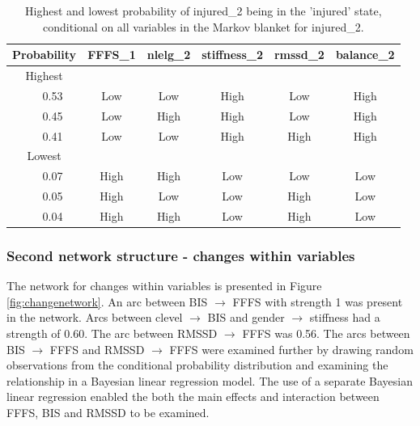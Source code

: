 \documentclass[man,floatsintext]{apa6}
\begin{document}
\begin{table}[H]

\begin{center}
\begin{threeparttable}

\caption{\label{tab:query4}Highest and lowest probability of injured\_2 being in the 'injured' state, conditional on all variables in the Markov blanket for injured\_2.}

\begin{tabular}{cccccc}
\toprule
Probability & \multicolumn{1}{c}{FFFS\_1} & \multicolumn{1}{c}{nlelg\_2} & \multicolumn{1}{c}{stiffness\_2} & \multicolumn{1}{c}{rmssd\_2} & \multicolumn{1}{c}{balance\_2}\\
\midrule
Highest &  &  &  &  & \\
\ \ \ 0.53 & Low & Low & High & Low & High\\
\ \ \ 0.45 & Low & High & High & Low & High\\
\ \ \ 0.41 & Low & Low & High & High & High\\
Lowest &  &  &  &  & \\
\ \ \ 0.07 & High & High & Low & Low & Low\\
\ \ \ 0.05 & High & Low & Low & High & Low\\
\ \ \ 0.04 & High & High & Low & High & Low\\
\bottomrule
\end{tabular}

\end{threeparttable}
\end{center}

\end{table}

\hypertarget{second-network-structure---changes-within-variables}{%
\subsubsection{Second network structure - changes within variables}\label{second-network-structure---changes-within-variables}}

The network for changes within variables is presented in Figure \ref{fig:changenetwork}.
An arc between BIS \(\rightarrow\) FFFS with strength 1 was present in the network.
Arcs between clevel \(\rightarrow\) BIS and gender \(\rightarrow\) stiffness had a strength of 0.60.
The arc between RMSSD \(\rightarrow\) FFFS was 0.56.
The arcs between BIS \(\rightarrow\) FFFS and RMSSD \(\rightarrow\) FFFS were examined further by drawing random observations from the conditional probability distribution and examining the relationship in a Bayesian linear regression model.
The use of a separate Bayesian linear regression enabled the both the main effects and interaction between FFFS, BIS and RMSSD to be examined.
\end{document}
